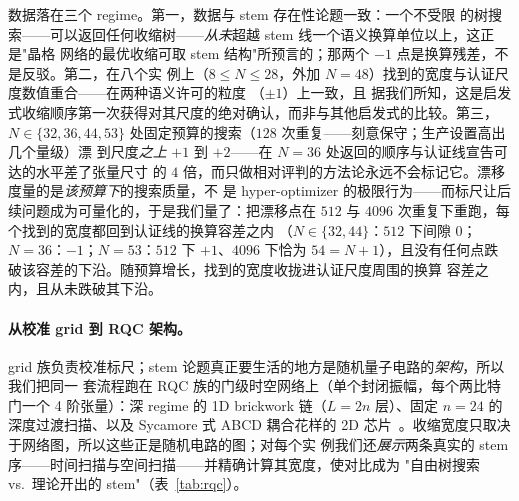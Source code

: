 \documentclass[11pt]{ctexart}
\begin{document}
数据落在三个 regime。第一，数据与 stem 存在性论题一致：一个不受限
的树搜索——可以返回任何收缩树——\emph{从未}超越 stem 线一个语义换算单位以上，这正是"晶格
网络的最优收缩可取 stem 结构"所预言的；那两个 $-1$ 点是换算残差，不是反驳。第二，在八个实
例上（$8\le N\le 28$，外加 $N=48$）找到的宽度与认证尺度数值重合——在两种语义许可的粒度
（$\pm1$）上一致，且
据我们所知，这是启发式收缩顺序第一次获得对其尺度的绝对确认，而非与其他启发式的比较。第三，
$N\in\{32,36,44,53\}$ 处固定预算的搜索（$128$ 次重复——刻意保守；生产设置高出几个量级）漂
到尺度\emph{之上} $+1$ 到 $+2$——在 $N=36$ 处返回的顺序与认证线宣告可达的水平差了张量尺寸
的 $4$ 倍，而只做相对评判的方法论永远不会标记它。漂移度量的是\emph{该预算下}的搜索质量，不
是 hyper-optimizer 的极限行为——而标尺让后续问题成为可量化的，于是我们量了：把漂移点在
$512$ 与 $4096$ 次重复下重跑，每个找到的宽度都回到认证线的换算容差之内
（$N\in\{32,44\}$：$512$ 下间隙 $0$；$N=36$：$-1$；$N=53$：$512$ 下 $+1$、$4096$ 下恰为
$54=N+1$），且没有任何点跌破该容差的下沿。随预算增长，找到的宽度收拢进认证尺度周围的换算
容差之内，且从未跌破其下沿。

\paragraph{从校准 grid 到 RQC 架构。}
grid 族负责校准标尺；stem 论题真正要生活的地方是随机量子电路的\emph{架构}，所以我们把同一
套流程跑在 RQC 族的门级时空网络上（单个封闭振幅，每个两比特门一个 4 阶张量）：深 regime 的
1D brickwork 链（$L=2n$ 层）、固定 $n=24$ 的深度过渡扫描、以及 Sycamore 式 ABCD 耦合花样的
2D 芯片~\cite{arute2019quantum}。收缩宽度只取决于网络图，所以这些正是随机电路的图；对每个实
例我们还\emph{展示}两条真实的 stem 序——时间扫描与空间扫描——并精确计算其宽度，使对比成为
"自由树搜索 vs.\ 理论开出的 stem"（表~\ref{tab:rqc}）。
\end{document}
